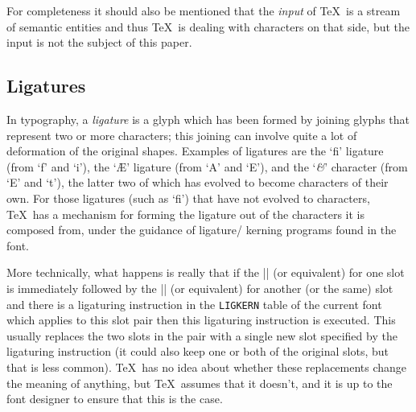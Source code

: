 \documentclass[a4paper]{article}
\begin{document}
For completeness it should also be mentioned that the \emph{input} of 
\TeX\ is a stream of semantic entities and thus \TeX\ is dealing with 
characters on that side, but the input is not the subject of this 
paper.


\subsection{Ligatures}

In typography, a \emph{ligature} is a glyph which has been formed by 
joining glyphs that represent two or more characters; this joining can 
involve quite a lot of deformation of the original shapes. Examples 
of ligatures are the `fi' ligature (from `f' and `i'), the `\AE' 
ligature (from `A' and `E'), and the `\textit{\&}' character (from `E' 
and `t'), the latter two of which has evolved to become characters of 
their own. For those ligatures (such as `fi') that have not evolved to 
characters, \TeX\ has a mechanism for forming the ligature out of the 
characters it is composed from, under the guidance of ligature\slash 
kerning programs found in the font.

More technically, what happens is really that if the |\char| (or 
equivalent) for one slot is immediately followed by the |\char| (or 
equivalent) for another (or the same) slot and there is a ligaturing 
instruction in the \texttt{\small LIGKERN} table of the current font 
which applies to this slot pair then this ligaturing instruction is 
executed. This usually replaces the two slots in the pair with a 
single new slot specified by the ligaturing instruction (it could 
also keep one or both of the original slots, but that is less common). 
\TeX\ has no idea about whether these replacements change the meaning 
of anything, but \TeX\ assumes that it doesn't, and it is up to the 
font designer to ensure that this is the case.
\end{document}
